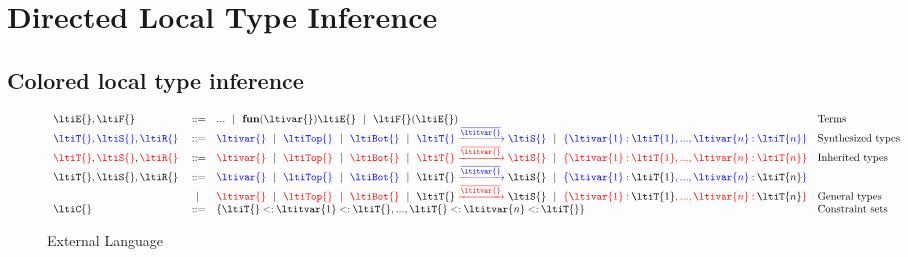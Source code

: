 \chapter{Directed Local Type Inference}
\label{chapter:symbolic:directed-lti}

\section{Colored local type inference}

\begin{figure}
$$
\begin{array}{lrll}
  \ltiE{}, \ltiF{} &::=& ... \alt
                         \ltiufun{\ltivar{}}{\ltiE{}} \alt
                         \ltiapp{\ltiF{}}{\ltiE{}}
                      &\mbox{Terms} \\
  \ltiSyn{\ltiT{}}, \ltiSyn{\ltiS{}}, \ltiSyn{\ltiR{}} &::=& 
                         \ltiSyn{\ltivar{}} \alt
                         \ltiSyn{\ltiTop{}} \alt
                         \ltiSyn{\ltiBot{}} \alt
                         \ltiSyn{\ltiArrow{\ltiT{}}{\overline{\ltitvar{}}}{\ltiS{}}} \alt
                         \ltiSyn{\ltiRec{\hastype{\ltivar{1}}{\ltiT{1}}, ..., \hastype{\ltivar{n}}{\ltiT{n}}}}
                      &\mbox{Synthesized types} \\
  \ltiChk{\ltiT{}}, \ltiChk{\ltiS{}}, \ltiChk{\ltiR{}} &::=& 
                         \ltiChk{\ltivar{}} \alt
                         \ltiChk{\ltiTop{}} \alt
                         \ltiChk{\ltiBot{}} \alt
                         \ltiChk{\ltiArrow{\ltiT{}}{\overline{\ltitvar{}}}{\ltiS{}}} \alt
                         \ltiChk{\ltiRec{\hastype{\ltivar{1}}{\ltiT{1}}, ..., \hastype{\ltivar{n}}{\ltiT{n}}}}
                      &\mbox{Inherited types} \\
  \ltiT{}, \ltiS{}, \ltiR{} &::=& 
                         \ltiSyn{\ltivar{}} \alt
                         \ltiSyn{\ltiTop{}} \alt
                         \ltiSyn{\ltiBot{}} \alt
                         \ltiSyn{\ltiArrow{\ltiSynChk{\ltiT{}}}{\overline{\ltitvar{}}}{\ltiSynChk{\ltiS{}}}} \alt
                         \ltiSyn{\ltiRec{\hastype{\ltivar{1}}{\ltiSynChk{\ltiT{1}}},
                                    ..., \hastype{\ltivar{n}}{\ltiSynChk{\ltiT{n}}}}}
                                    \\&\alt&
                         \ltiChk{\ltivar{}} \alt
                         \ltiChk{\ltiTop{}} \alt
                         \ltiChk{\ltiBot{}} \alt
                         \ltiChk{\ltiArrow{\ltiSynChk{\ltiT{}}}{\overline{\ltitvar{}}}{\ltiSynChk{\ltiS{}}}}
                         \alt
                         \ltiChk{\ltiRec{\hastype{\ltivar{1}}{\ltiSynChk{\ltiT{1}}},
                                    ..., \hastype{\ltivar{n}}{\ltiSynChk{\ltiT{n}}}}}
                      &\mbox{General types} \\
  \ltiC{} &::=& {\ltiCSet{\ltiCEntry{\ltiT{}}{\ltitvar{1}}{\ltiT{}}, ...,
                          \ltiCEntry{\ltiT{}}{\ltitvar{n}}{\ltiT{}}}}
                      &\mbox{Constraint sets} \\
\end{array}
$$
\caption{External Language}
\end{figure}

